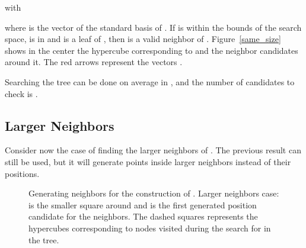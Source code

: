 \documentclass[letterpaper, 10 pt, conference]{ieeeconf}
\theoremstyle{definition}
\begin{document}
with

where  is the  vector of the standard basis of .
If  is within the bounds of the search space,  is in  and  is a leaf of , then  is a valid neighbor of .
Figure~\ref{same_size} shows in the center the hypercube corresponding to  and the neighbor candidates around it. The red arrows represent the vectors .

Searching the tree  can be done on average in , and the number of candidates to check is .

\subsection{Larger Neighbors}

Consider now the case of finding the larger neighbors of . The previous result can still be used, but it will generate points inside larger neighbors instead of their positions.
\begin{figure}[ht]
\centering
	
\newcommand{\drawChildren}[2]{\draw[treenodes] #1 rectangle ();
\draw[treenodes] #1 rectangle ();
\draw[treenodes] #1 rectangle ();
\draw[treenodes] #1 rectangle ();}

 	\caption{Generating neighbors for the construction of . Larger neighbors case:  is the smaller square  around  and  is the first generated position candidate for the neighbors. The dashed squares represents the hypercubes corresponding to nodes visited during the search for  in the tree.}
	\label{larger}
\end{figure}
\end{document}
